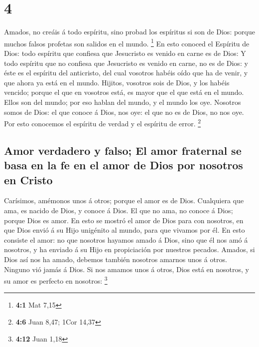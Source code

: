 \hypertarget{section-3}{%
\section{4}\label{section-3}}

 Amados, no creáis á todo espíritu, sino probad los
espíritus si son de Dios: porque muchos falsos profetas son salidos en
el mundo. \footnote{\textbf{4:1} Mat 7,15}  En esto
conoced el Espíritu de Dios: todo espíritu que confiesa que Jesucristo
es venido en carne es de Dios:  Y todo espíritu que no
confiesa que Jesucristo es venido en carne, no es de Dios: y éste es el
espíritu del anticristo, del cual vosotros habéis oído que ha de venir,
y que ahora ya está en el mundo.  Hijitos, vosotros sois
de Dios, y los habéis vencido; porque el que en vosotros está, es mayor
que el que está en el mundo.  Ellos son del mundo; por eso
hablan del mundo, y el mundo los oye.  Nosotros somos de
Dios: el que conoce á Dios, nos oye: el que no es de Dios, no nos oye.
Por esto conocemos el espíritu de verdad y el espíritu de error.
\footnote{\textbf{4:6} Juan 8,47; 1Cor 14,37}

\hypertarget{amor-verdadero-y-falso-el-amor-fraternal-se-basa-en-la-fe-en-el-amor-de-dios-por-nosotros-en-cristo}{%
\subsection{Amor verdadero y falso; El amor fraternal se basa en la fe
en el amor de Dios por nosotros en
Cristo}\label{amor-verdadero-y-falso-el-amor-fraternal-se-basa-en-la-fe-en-el-amor-de-dios-por-nosotros-en-cristo}}

 Carísimos, amémonos unos á otros; porque el amor es de
Dios. Cualquiera que ama, es nacido de Dios, y conoce á Dios.
 El que no ama, no conoce á Dios; porque Dios es amor.
 En esto se mostró el amor de Dios para con nosotros, en
que Dios envió á su Hijo unigénito al mundo, para que vivamos por él.
 En esto consiste el amor: no que nosotros hayamos amado
á Dios, sino que él nos amó á nosotros, y ha enviado á su Hijo en
propiciación por nuestros pecados.  Amados, si Dios así
nos ha amado, debemos también nosotros amarnos unos á otros.
 Ninguno vió jamás á Dios. Si nos amamos unos á otros,
Dios está en nosotros, y su amor es perfecto en nosotros: \footnote{\textbf{4:12}
  Juan 1,18}


